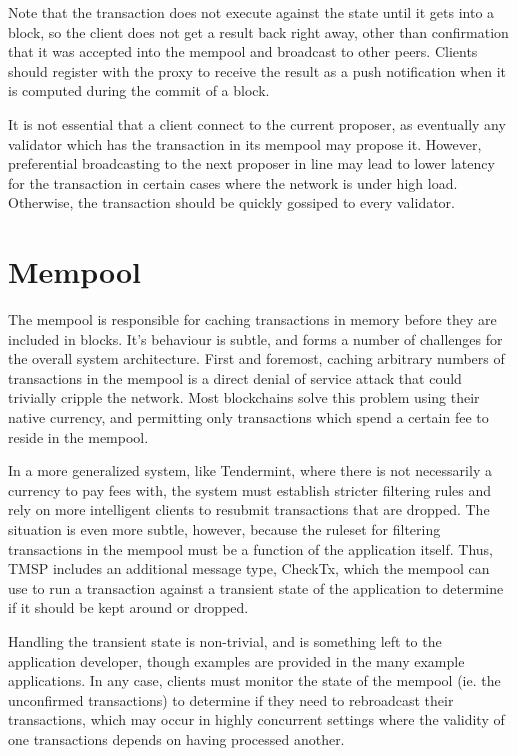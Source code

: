 Note that the transaction does not execute against the state until it gets into a block,
so the client does not get a result back right away, other than confirmation that it was accepted into the mempool and broadcast to other peers.
Clients should register with the proxy to receive the result as a push notification when it is computed during the commit of a block.

It is not essential that a client connect to the current proposer, 
as eventually any validator which has the transaction in its mempool may propose it.
However, preferential broadcasting to the next proposer in line may lead to lower latency for the transaction
in certain cases where the network is under high load. Otherwise, the transaction should be quickly gossiped to every validator.

\section{Mempool}

The mempool is responsible for caching transactions in memory before they are included in blocks.
It's behaviour is subtle, and forms a number of challenges for the overall system architecture.
First and foremost, caching arbitrary numbers of transactions in the mempool is a direct denial of service attack
that could trivially cripple the network. Most blockchains solve this problem using their native currency,
and permitting only transactions which spend a certain fee to reside in the mempool.

In a more generalized system, like Tendermint, where there is not necessarily a currency to pay fees with,
the system must establish stricter filtering rules and rely on more intelligent clients to resubmit transactions that are dropped.
The situation is even more subtle, however, because the ruleset for filtering transactions in the mempool must be a function of the application itself.
Thus, TMSP includes an additional message type, CheckTx, 
which the mempool can use to run a transaction against a transient state of the application to determine if it should be kept around or dropped.

Handling the transient state is non-trivial, and is something left to the application developer, 
though examples are provided in the many example applications. 
In any case, clients must monitor the state of the mempool (ie. the unconfirmed transactions) to determine if they need to rebroadcast their transactions,
which may occur in highly concurrent settings where the validity of one transactions depends on having processed another.

